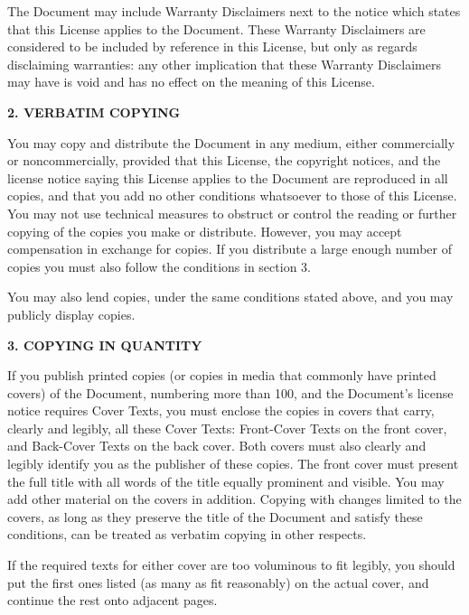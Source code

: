 The Document may include Warranty Disclaimers next to the notice which
states that this License applies to the Document.  These Warranty
Disclaimers are considered to be included by reference in this
License, but only as regards disclaiming warranties: any other
implication that these Warranty Disclaimers may have is void and has
no effect on the meaning of this License.


\begin{center}
{\Large\bf 2. VERBATIM COPYING}
\end{center}

You may copy and distribute the Document in any medium, either
commercially or noncommercially, provided that this License, the
copyright notices, and the license notice saying this License applies
to the Document are reproduced in all copies, and that you add no other
conditions whatsoever to those of this License.  You may not use
technical measures to obstruct or control the reading or further
copying of the copies you make or distribute.  However, you may accept
compensation in exchange for copies.  If you distribute a large enough
number of copies you must also follow the conditions in section 3.

You may also lend copies, under the same conditions stated above, and
you may publicly display copies.


\begin{center}
{\Large\bf 3. COPYING IN QUANTITY}
\end{center}


If you publish printed copies (or copies in media that commonly have
printed covers) of the Document, numbering more than 100, and the
Document's license notice requires Cover Texts, you must enclose the
copies in covers that carry, clearly and legibly, all these Cover
Texts: Front-Cover Texts on the front cover, and Back-Cover Texts on
the back cover.  Both covers must also clearly and legibly identify
you as the publisher of these copies.  The front cover must present
the full title with all words of the title equally prominent and
visible.  You may add other material on the covers in addition.
Copying with changes limited to the covers, as long as they preserve
the title of the Document and satisfy these conditions, can be treated
as verbatim copying in other respects.

If the required texts for either cover are too voluminous to fit
legibly, you should put the first ones listed (as many as fit
reasonably) on the actual cover, and continue the rest onto adjacent
pages.

